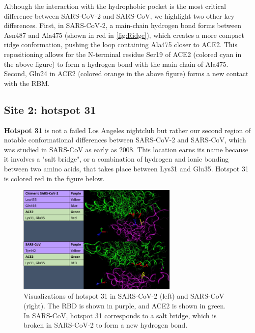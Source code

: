 {{Although the interaction with the hydrophobic pocket is the most critical difference between SARS-CoV-2 and SARS-CoV, we highlight two other key differences. First, in SARS-CoV-2, a main-chain hydrogen bond forms between Asn487 and Ala475 (shown in red in \autoref{fig:Ridge}), which creates a more compact ridge conformation, pushing the loop containing Ala475 closer to ACE2. This repositioning allows for the N-terminal residue Ser19 of ACE2 (colored cyan in the above figure) to form a hydrogen bond with the main chain of Ala475. Second, Gln24 in ACE2 (colored orange in the above figure) forms a new contact with the RBM.

\FloatBarrier
{}
\subsection{Site 2: hotspot 31}

\textbf{Hotspot 31} is not a failed Los Angeles nightclub but rather our second region of notable conformational differences between SARS-CoV-2 and SARS-CoV, which was studied in SARS-CoV as early as 2008. This location earns its name because it involves a "salt bridge", or a combination of hydrogen and ionic bonding between two amino acids, that takes place between Lys31 and Glu35. Hotspot 31 is colored red in the figure below.

\begin{qbox}\end{qbox}

\begin{figure}[h]
	\centering
	\mySfFamily
	\includegraphics[width = 0.7\textwidth]{../images/Hotspot31.png}
	\caption{Visualizations of hotspot 31 in SARS-CoV-2 (left) and SARS-CoV (right). The RBD is shown in purple, and ACE2 is shown in green. In SARS-CoV, hotspot 31 corresponds to a salt bridge, which is broken in SARS-CoV-2 to form a new hydrogen bond.}
	\label{fig:Hotspot31}
\end{figure}

}}
